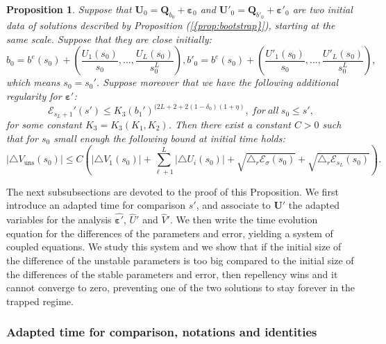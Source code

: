 \documentclass[11pt,a4paper,reqno]{amsart}
\newtheorem{proposition}[theorem]{Proposition}
\theoremstyle{remark}
\numberwithin{equation}{section}
\begin{document}
\begin{proposition}
\label{variete:prop:parametres lipschitz}
Suppose that $\boldsymbol{U}_0=\boldsymbol{Q}_{b_0}+\boldsymbol{\varepsilon}_0$ and $\boldsymbol{U'}_0=\boldsymbol{Q}_{b'_0}+\boldsymbol{\varepsilon'}_0$ are two initial data of solutions described by Proposition {{\rm (\ref{{prop:bootstrap}})}}, starting at the same scale. Suppose that they are close initially:
\begin{equation}
b_0=b^e(s_0)+\left(\frac{U_1(s_0)}{s_0},...,\frac{U_L(s_0)}{s_0^L}\right), b'_0=b^e(s_0)+\left(\frac{U'_1(s_0)}{s_0},...,\frac{U'_L(s_0)}{s_0^L}\right),
\end{equation}
which means $s_0=s_0'$. Suppose moreover that we have the following additional regularity for $\boldsymbol{\varepsilon'}$:
\begin{equation} \label{variete:eq:estimation supplementaire varepsilon'}
\mathcal{E}_{s_L+1}'(s')\leq K_3 (b_1')^{(2L+2+2(1-\delta_0)(1+\eta)}, \ for \ all \ s_0\leq s',
\end{equation}
for some constant $K_3=K_3(K_1,K_2)$. Then there exist a constant $C>0$ such that for $s_0$ small enough the following bound at initial time holds:
\begin{equation} \label{variete:eq:lipschitz}
|\triangle V_{\text{uns}}(s_0)|\leq C\left( |\triangle V_1(s_0)|+\sum_{\ell+1}^L|\triangle U_i(s_0)|+\sqrt{\triangle_r \mathcal{E}_{\sigma}(s_0)}+\sqrt{\triangle_r \mathcal{E}_{s_L}(s_0)} \right).
\end{equation}
\end{proposition}

The next subsubsections are devoted to the proof of this Proposition. We first introduce an adapted time for comparison $\hat{s}'$, and associate to $\boldsymbol{U'}$ the adapted variables for the analysis $\hat{\boldsymbol{\varepsilon '}}$, $\hat{U}'$ and $\hat{V}'$. We then write the time evolution equation for the differences of the parameters and error, yielding a system of coupled equations. We study this system and we show that if the initial size of the difference of the unstable parameters is too big compared to the initial size of the differences of the stable parameters and error, then repellency wins and it cannot converge to zero, preventing one of the two solutions to stay forever in the trapped regime.

\subsubsection{Adapted time for comparison, notations and identities}
\end{document}
